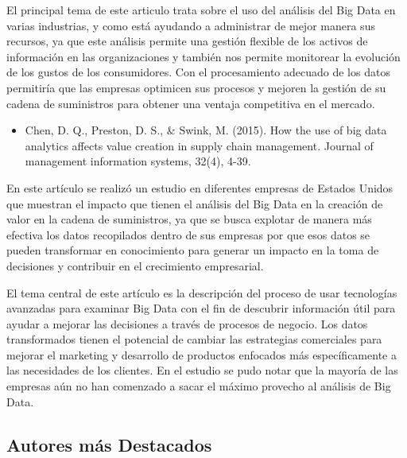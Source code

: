 \documentclass[Iberoamerican Journal of Industrial
Engineering,article,submit,moreauthors,pdftex]{Definitions/mdpi}
\providecommand{\tightlist}{%
  \setlength{\itemsep}{0pt}\setlength{\parskip}{0pt}}
\begin{document}
El principal tema de este articulo trata sobre el uso del análisis del
Big Data en varias industrias, y como está ayudando a administrar de
mejor manera sus recursos, ya que este análisis permite una gestión
flexible de los activos de información en las organizaciones y también
nos permite monitorear la evolución de los gustos de los consumidores.
Con el procesamiento adecuado de los datos permitiría que las empresas
optimicen sus procesos y mejoren la gestión de su cadena de suministros
para obtener una ventaja competitiva en el mercado.

\begin{itemize}
\tightlist
\item
  Chen, D. Q., Preston, D. S., \& Swink, M. (2015). How the use of big
  data analytics affects value creation in supply chain management.
  Journal of management information systems, 32(4), 4-39.
\end{itemize}

En este artículo se realizó un estudio en diferentes empresas de Estados
Unidos que muestran el impacto que tienen el análisis del Big Data en la
creación de valor en la cadena de suministros, ya que se busca explotar
de manera más efectiva los datos recopilados dentro de sus empresas por
que esos datos se pueden transformar en conocimiento para generar un
impacto en la toma de decisiones y contribuir en el crecimiento
empresarial.

El tema central de este artículo es la descripción del proceso de usar
tecnologías avanzadas para examinar Big Data con el fin de descubrir
información útil para ayudar a mejorar las decisiones a través de
procesos de negocio. Los datos transformados tienen el potencial de
cambiar las estrategias comerciales para mejorar el marketing y
desarrollo de productos enfocados más específicamente a las necesidades
de los clientes. En el estudio se pudo notar que la mayoría de las
empresas aún no han comenzado a sacar el máximo provecho al análisis de
Big Data.

\hypertarget{autores-muxe1s-destacados}{%
\subsection{Autores más Destacados}\label{autores-muxe1s-destacados}}
\end{document}
